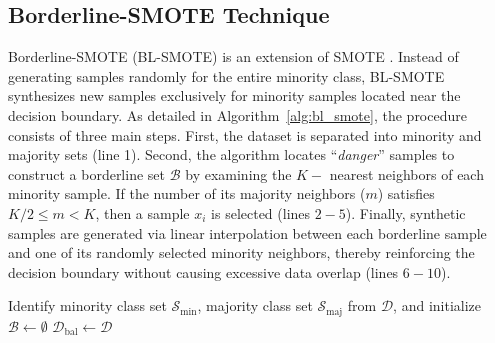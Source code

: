 \documentclass[pdflatex,sn-mathphys-num]{sn-jnl}%
\theoremstyle{thmstyleone}%
\theoremstyle{thmstyletwo}
\theoremstyle{thmstylethree}
\begin{document}
\subsection{Borderline-SMOTE Technique}\label{subsec2_2}
Borderline-SMOTE (BL-SMOTE) \cite{han2005borderline} is an extension of SMOTE \cite{chawla2002smote}. Instead of generating samples randomly for the entire minority class, BL-SMOTE synthesizes new samples exclusively for minority samples located near the decision boundary. As detailed in Algorithm~\ref{alg:bl_smote}, the procedure consists of three main steps. First, the dataset is separated into minority and majority sets (line 1). Second, the algorithm locates ``\textit{danger}'' samples to construct a borderline set $\mathcal{B}$ by examining the $K-$ nearest neighbors of each minority sample. If the number of its majority neighbors ($m$) satisfies $K/2 \leq m < K$, then a sample $x_i$ is selected   (lines $2-5$). Finally, synthetic samples are generated via linear interpolation between each borderline sample and one of its randomly selected minority neighbors, thereby reinforcing the decision boundary without causing excessive data overlap (lines $6-10$).

\begin{algorithm}[H]
\small
\caption{Borderline-SMOTE (BL-SMOTE) Algorithm}
\label{alg:bl_smote}
Identify minority class set $\mathcal{S}_{\mathrm{min}}$, majority class set $\mathcal{S}_{\mathrm{maj}}$ from $\mathcal{D}$, and initialize $\mathcal{B} \leftarrow \emptyset$\;
$\mathcal{D}_{\mathrm{bal}} \leftarrow \mathcal{D}$\;
\;
\end{algorithm}
\end{document}
